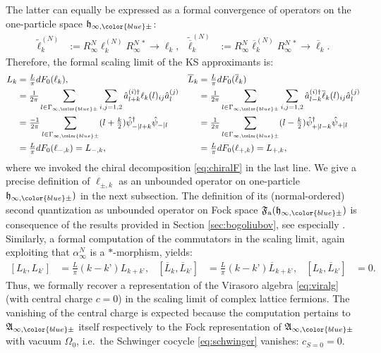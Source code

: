\documentclass[a4paper, 11pt]{article}
\newcommand{\fA}{\mathfrak{A}}\newcommand{\cA}{\mathcal{A}}\newcommand{\dA}{\mathds{A}}\newcommand{\sA}{\mathscr{A}}
\newcommand{\ua}{\textup a}
\newcommand{\fF}{\mathfrak{F}}\newcommand{\cF}{\mathcal{F}}\newcommand{\dF}{\mathds{F}}\newcommand{\sF}{\mathscr{F}}
\newcommand{\fh}{\mathfrak{h}}
\DeclareMathOperator{\1}{\mathds{1}}
\begin{document}
The latter can equally be expressed as a formal convergence of operators on the one-particle space $\fh_{\infty,{\color{blue}\pm}}$:
\begin{align}
\label{eq:latviraconv1pformal}
\tilde{\ell}^{(N)}_{k} & := R^{N}_{\infty}\ell^{(N)}_{k}R^{N\!\ *}_{\infty} \rightarrow \ell_{k}, & \tilde{\overline{\ell}}^{(N)}_{k} & := R^{N}_{\infty}\overline{\ell}^{(N)}_{k}R^{N\!\ *}_{\infty} \rightarrow \overline{\ell}_{k}.
\end{align}
Therefore, the formal scaling limit of the KS approximants is:
\begin{align}
\label{eq:scalelimvira}
L_{k} & = \tfrac{L}{\pi}dF_{0}(\ell_{k}), & \overline{L}_{k} & = \tfrac{L}{\pi}dF_{0}(\overline{\ell}_{k}) \\ \nonumber
& = \tfrac{1}{2\pi}\sum_{l\in\Gamma_{\infty,{\color{blue}\pm}}}\sum_{i,j=1,2}\hat{a}^{(i)\dag}_{l+k}\ell_{k}(l)_{ij}\hat{a}^{(j)}_{l} &
 & = \tfrac{1}{2\pi}\sum_{l\in\Gamma_{\infty,{\color{blue}\pm}}}\sum_{i,j=1,2}\hat{a}^{(i)\dag}_{l-k}\overline{\ell}_{k}(l)_{ij}\hat{a}^{(j)} _{l} \\ \nonumber
 & = \tfrac{-1}{2\pi}\sum_{l\in\Gamma_{\infty,{\color{blue}\pm}}}(l+\tfrac{k}{2})\hat{\psi}^{\dag}_{-|l+k}\hat{\psi}_{-|l} &  & = \tfrac{1}{2\pi}\sum_{l\in\Gamma_{\infty,{\color{blue}\pm}}}(l-\tfrac{k}{2})\hat{\psi}^{\dag}_{+|l-k}\hat{\psi}_{+|l} \\ \nonumber
 & = \tfrac{L}{\pi}dF_{0}(\ell_{-,k}) = L_{-,k}, &  & = \tfrac{L}{\pi}dF_{0}(\ell_{+,k}) = L_{+,k},
\end{align}
where we invoked the chiral decomposition \eqref{eq:chiralF} in the last line. We give a precise definition of $\ell_{\pm,k}$ as an unbounded operator on one-particle $\fh_{\infty,{\color{blue}\pm}})$ in the next subsection. The definition of its (normal-ordered) second quantization as unbounded operator on Fock space $\fF_{\ua}(\fh_{\infty,{\color{blue}\pm}})$ is consequence of the results provided in Section \ref{sec:bogoliubov}, see especially \cite{CareyOnFermionGauge}. Similarly, a formal computation of the commutators in the scaling limit, again exploiting that $\alpha^{N}_{\infty}$ is a $*$-morphism, yields:
\begin{align}
\label{eq:scalelimviraCRex}
\left[L_{k}, L_{k’}\right] &\!=\!\tfrac{L}{\pi}(k-k’)L_{k+k’}, & \left[\overline{L}_{k}, \overline{L}_{k’}\right] &\!=\!\tfrac{L}{\pi}(k-k’)\overline{L}_{k+k’}, & \left[L_{k}, \overline{L}_{k’}\right] &\!=\!0.
\end{align}
Thus, we formally recover a representation of the Virasoro algebra \eqref{eq:viralg} (with central charge $c=0$) in the scaling limit of complex lattice fermions. The vanishing of the central charge is expected because the computation pertains to $\fA_{\infty,{\color{blue}\pm}}$ itself respectively to the Fock representation of $\fA_{\infty,{\color{blue}\pm}}$ with vacuum $\Omega_{0}$, i.e.~the Schwinger cocycle \eqref{eq:schwinger} vanishes: $c_{S=0} = 0$.
\end{document}
